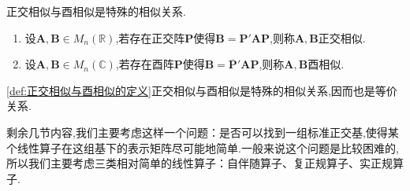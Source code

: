 \begin{formal}
    \begin{definition}[正交相似与酉相似的定义]\label{def:正交相似与酉相似的定义}正交相似与酉相似是特殊的相似关系.

        \begin{enumerate}[label={\textup{(\arabic*)}}]
            \item 设$\bm{A},\bm{B}\in M_n\left(\mathbb{R}\right)$,若存在正交阵$\bm{P}$使得$\bm{B}=\bm{P}'\bm{AP}$,则称$\bm{A},\bm{B}$正交相似.
            \item 设$\bm{A},\bm{B}\in M_n\left(\mathbb{C}\right)$,若存在酉阵$\bm{P}$使得$\bm{B}=\overline{\bm{P}}'\bm{AP}$,则称$\bm{A},\bm{B}$酉相似.
        \end{enumerate}
    \end{definition}
\end{formal}
\begin{red}
    \begin{remark}
        \cref{def:正交相似与酉相似的定义}正交相似与酉相似是特殊的相似关系,因而也是等价关系.
    \end{remark}
\end{red}
\begin{red}
    \begin{remark}
        剩余几节内容,我们主要考虑这样一个问题：是否可以找到一组标准正交基,使得某个线性算子在这组基下的表示矩阵尽可能地简单.一般来说这个问题是比较困难的,所以我们主要考虑三类相对简单的线性算子：自伴随算子、复正规算子、实正规算子.
    \end{remark}
\end{red}
